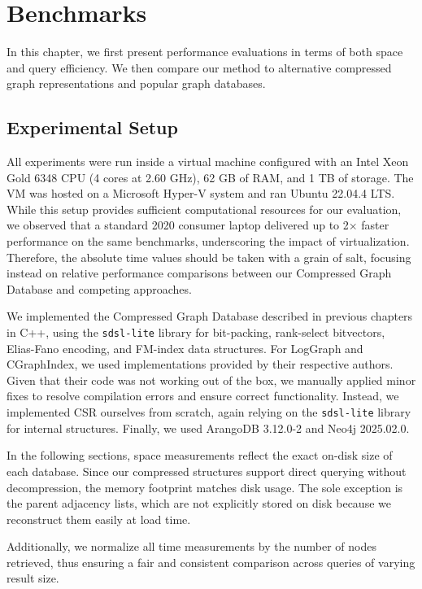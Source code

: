 \chapter{Benchmarks}

In this chapter, we first present performance evaluations in terms of both space and query efficiency. We then compare our method to alternative compressed graph representations and popular graph databases.

\section{Experimental Setup}

All experiments were run inside a virtual machine configured with an Intel Xeon Gold 6348 CPU (4 cores at 2.60 GHz), 62 GB of RAM, and 1 TB of storage. The VM was hosted on a Microsoft Hyper-V system and ran Ubuntu 22.04.4 LTS. While this setup provides sufficient computational resources for our evaluation, we observed that a standard 2020 consumer laptop delivered up to 2× faster performance on the same benchmarks, underscoring the impact of virtualization. Therefore, the absolute time values should be taken with a grain of salt, focusing instead on relative performance comparisons between our Compressed Graph Database and competing approaches.

We implemented the Compressed Graph Database described in previous chapters in C++, using the \verb|sdsl-lite| library for bit-packing, rank-select bitvectors, Elias-Fano encoding, and FM-index data structures. For LogGraph and CGraphIndex, we used implementations provided by their respective authors. Given that their code was not working out of the box, we manually applied minor fixes to resolve compilation errors and ensure correct functionality. Instead, we implemented CSR ourselves from scratch, again relying on the \verb|sdsl-lite| library for internal structures. Finally, we used ArangoDB 3.12.0-2 and Neo4j 2025.02.0.

In the following sections, space measurements reflect the exact on-disk size of each database. Since our compressed structures support direct querying without decompression, the memory footprint matches disk usage. The sole exception is the parent adjacency lists, which are not explicitly stored on disk because we reconstruct them easily at load time.

Additionally, we normalize all time measurements by the number of nodes retrieved, thus ensuring a fair and consistent comparison across queries of varying result size.
\FloatBarrier


